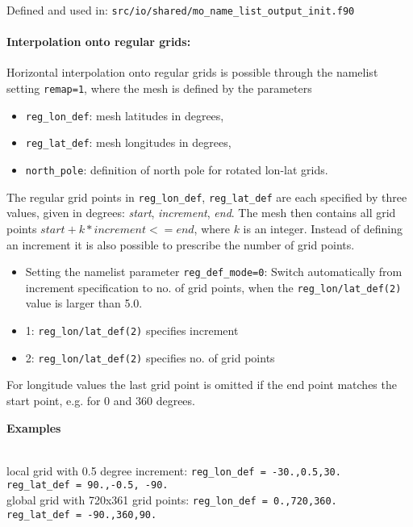 Defined and used in: \verb+src/io/shared/mo_name_list_output_init.f90+

\paragraph{Interpolation onto regular grids:}

Horizontal interpolation onto regular grids is possible through the namelist setting  \texttt{remap=1}, where
the mesh is defined by the parameters
\begin{itemize}
  \item \texttt{reg\_lon\_def}: mesh latitudes in degrees,
  \item \texttt{reg\_lat\_def}: mesh longitudes in degrees,
  \item \texttt{north\_pole}: definition of north pole for rotated lon-lat grids.
\end{itemize}
The regular grid points in \texttt{reg\_lon\_def}, \texttt{reg\_lat\_def} are each specified by three values, given in degrees:
\emph{start}, \emph{increment}, \emph{end}.
The mesh then contains all grid points $start + k * increment <= end$, where $k$ is an integer.
Instead of defining an increment it is also possible to prescribe the number of grid points.
\begin{itemize}
  \item Setting the namelist parameter \texttt{reg\_def\_mode=0}: 
        Switch automatically from increment specification to no. of grid points,
        when the  \texttt{reg\_lon/lat\_def(2)} value is larger than 5.0.
  \item 1: \texttt{reg\_lon/lat\_def(2)} specifies increment
  \item 2: \texttt{reg\_lon/lat\_def(2)} specifies no. of grid points
\end{itemize}
For longitude values the last grid point is omitted if the end point matches the start point, e.g. for 0 and 360 degrees.

\begin{tabbing}
  \parbox{0.7\textwidth}{\textbf{Examples}} \= \\
  local grid with 0.5 degree increment: \>
  \texttt{reg\_lon\_def = -30.,0.5,30.}
  \\ \>
  \texttt{reg\_lat\_def = 90.,-0.5, -90.}
  \\[0.5em]
  global grid with 720x361 grid points: \>
  \texttt{reg\_lon\_def = 0.,720,360.}
  \\ \>
  \texttt{reg\_lat\_def = -90.,360,90.}
\end{tabbing}


